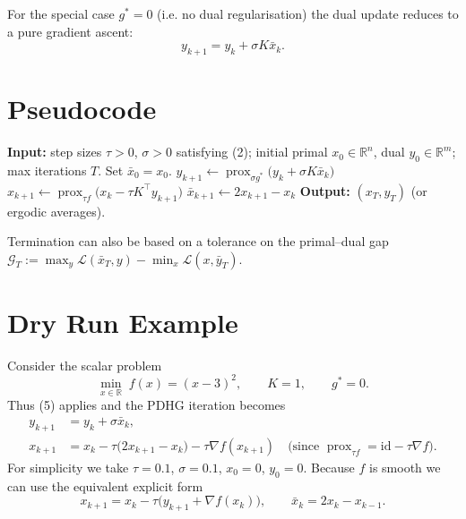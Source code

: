 \documentclass{article}
\begin{document}
\medskip
For the special case $g^{*}=0$ (i.e. no dual regularisation) the dual update reduces to a pure gradient ascent:
\[
y_{k+1}=y_{k}+\sigma K\bar{x}_{k}.
\tag{5}
\]

\section*{Pseudocode}
\begin{algorithm}[H]
\caption{Primal–Dual Hybrid Gradient}
\begin{algorithmic}[1]
\STATE \textbf{Input:} step sizes $\tau>0$, $\sigma>0$ satisfying (2); 
initial primal $x_{0}\in\mathbb{R}^{n}$, dual $y_{0}\in\mathbb{R}^{m}$; 
max iterations $T$.
\STATE Set $\bar{x}_{0}=x_{0}$.
    \STATE $y_{k+1}\gets\operatorname{prox}_{\sigma g^{*}}\!\big(y_{k}+\sigma K\bar{x}_{k}\big)$ \hfill{}
    \STATE $x_{k+1}\gets\operatorname{prox}_{\tau f}\!\big(x_{k}-\tau K^{\top}y_{k+1}\big)$ \hfill{}
    \STATE $\bar{x}_{k+1}\gets 2x_{k+1}-x_{k}$ \hfill{}
\ENDFOR
\STATE \textbf{Output:} $(x_{T},y_{T})$ (or ergodic averages).
\end{algorithmic}
\end{algorithm}
Termination can also be based on a tolerance on the primal–dual gap
\(
\mathcal{G}_{T}:=\max_{y}\mathcal{L}(\bar{x}_{T},y)-\min_{x}\mathcal{L}(x,\bar{y}_{T}).
\)

\section*{Dry Run Example}
Consider the scalar problem
\[
\min_{x\in\mathbb{R}} \; f(x)=(x-3)^{2},\qquad K=1,\qquad g^{*}=0.
\]
Thus (5) applies and the PDHG iteration becomes
\[
\begin{aligned}
y_{k+1}&=y_{k}+\sigma \bar{x}_{k},\\
x_{k+1}&=x_{k}-\tau\big(2x_{k+1}-x_{k}\big)-\tau \nabla f(x_{k+1}) \quad\text{(since } \operatorname{prox}_{\tau f}= \text{id}-\tau\nabla f\text{)}.
\end{aligned}
\]
For simplicity we take $\tau=0.1$, $\sigma=0.1$, $x_{0}=0$, $y_{0}=0$.
Because $f$ is smooth we can use the equivalent explicit form
\[
x_{k+1}=x_{k}-\tau\big( y_{k+1}+ \nabla f(x_{k})\big),
\qquad \bar{x}_{k}=2x_{k}-x_{k-1}.
\]
\end{document}
